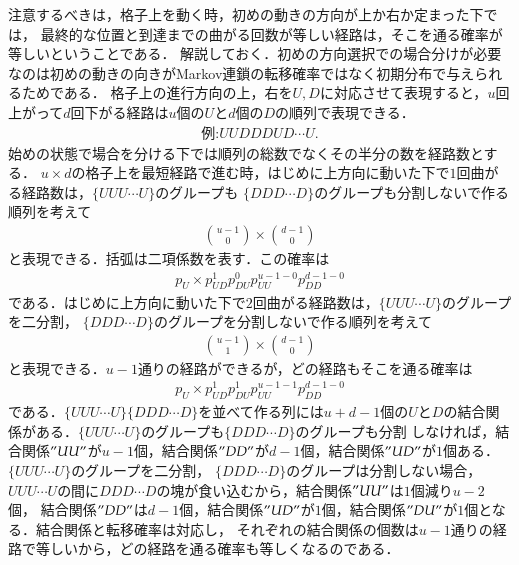 \documentclass[a4j,papersize,disablejfam,slide,14pt]{jsarticle}
\begin{document}
    注意するべきは，格子上を動く時，初めの動きの方向が上か右か定まった下では，
    最終的な位置と到達までの曲がる回数が等しい経路は，そこを通る確率が等しいということである．
    解説しておく．初めの方向選択での場合分けが必要なのは初めの動きの向きが{\rm Markov}連鎖の転移確率ではなく初期分布で与えられるためである．
    格子上の進行方向の上，右を$U,D$に対応させて表現すると，$u$回上がって$d$回下がる経路は$u$個の$U$と$d$個の$D$の順列で表現できる．
    \begin{align}
    	\mbox{例:}UUDDDUD\cdots U.
    \end{align}
    始めの状態で場合を分ける下では順列の総数でなくその半分の数を経路数とする．
    $u \times d$の格子上を最短経路で進む時，はじめに上方向に動いた下で$1$回曲がる経路数は，$\{UUU\cdots U\}$のグループも
    $\{DDD\cdots D\}$のグループも分割しないで作る順列を考えて
    \begin{align}
    	\binom{u-1}{0} \times \binom{d-1}{0}
    \end{align}
    と表現できる．括弧は二項係数を表す．この確率は
    \begin{align}
    	p_U \times p_{UD}^1 p_{DU}^0 p_{UU}^{u-1-0} p_{DD}^{d-1-0}
    \end{align}
    である．はじめに上方向に動いた下で$2$回曲がる経路数は，$\{UUU\cdots U\}$のグループを二分割，
    $\{DDD\cdots D\}$のグループを分割しないで作る順列を考えて
    \begin{align}
    	\binom{u-1}{1} \times \binom{d-1}{0}
    \end{align}
    と表現できる．$u-1$通りの経路ができるが，どの経路もそこを通る確率は
    \begin{align}
    	p_U \times p_{UD}^1 p_{DU}^1 p_{UU}^{u-1-1} p_{DD}^{d-1-0}
    \end{align}
    である．$\{UUU\cdots U\}\{DDD\cdots D\}$を並べて作る列には$u+d-1$個の$U$と$D$の結合関係がある．$\{UUU\cdots U\}$のグループも$\{DDD\cdots D\}$のグループも分割
    しなければ，結合関係$"UU"$が$u-1$個，結合関係$"DD"$が$d-1$個，結合関係$"UD"$が$1$個ある．$\{UUU\cdots U\}$のグループを二分割，
    $\{DDD\cdots D\}$のグループは分割しない場合，$UUU\cdots U$の間に$DDD\cdots D$の塊が食い込むから，結合関係$"UU"$は$1$個減り$u-2$個，
    結合関係$"DD"$は$d-1$個，結合関係$"UD"$が$1$個，結合関係$"DU"$が$1$個となる．結合関係と転移確率は対応し，
    それぞれの結合関係の個数は$u-1$通りの経路で等しいから，どの経路を通る確率も等しくなるのである．
    
\end{document}
